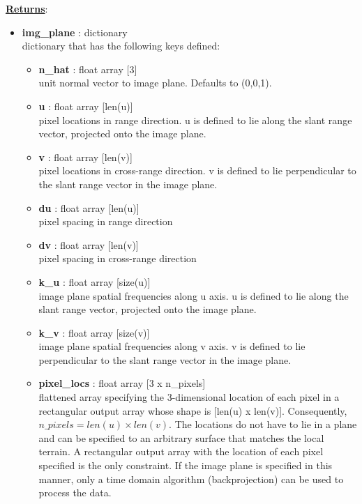 \documentclass{article}
\newcommand{\defs}[2]{\textbf{{#1}} : {#2}}
\begin{document}
\noindent \underline{\textbf{Returns}}:
\begin{itemize}
	  	\item \defs{img\_plane}{dictionary}\\
	  	dictionary that has the following keys defined:
		\begin{itemize}
			\item\defs{n\_hat}{float array [3]}\\
				unit normal vector to image plane.  Defaults to (0,0,1).
			\item \defs{u}{float array [len(u)]}\\
		    	pixel locations in range direction.  u is defined to lie along the slant range vector, projected onto the image plane.
			\item \defs{v}{float array [len(v)]}\\
		    	pixel locations in cross-range direction.  v is defined to lie perpendicular to the slant range vector in the image plane.
			\item \defs{du}{float array [len(u)]}\\
		    	pixel spacing in range direction
			\item \defs{dv}{float array [len(v)]}\\
		    	pixel spacing in cross-range direction
		    \item \defs{k\_u}{float array [size(u)]}\\
		    	image plane spatial frequencies along u axis.  u is defined to lie along the slant range vector, projected onto the image plane.
		    \item \defs{k\_v}{float array [size(v)]}\\
		    	image plane spatial frequencies along v axis.  v is defined to lie perpendicular to the slant range vector in the image plane.
		    \item \defs{pixel\_locs}{float array [3 x n\_pixels]}\\
		    	flattened array specifying the 3-dimensional location of each pixel in a rectangular output array whose shape is [len(u) x len(v)].  Consequently, $n\_pixels = len(u) \times len(v)$.  The locations do not have to lie in a plane and can be specified to an arbitrary surface that matches the local terrain.  A rectangular output array with the location of each pixel specified is the only constraint.  If the image plane is specified in this manner, only a time domain algorithm (backprojection) can be used to process the data.
		\end{itemize}
\end{itemize}
\end{document}
